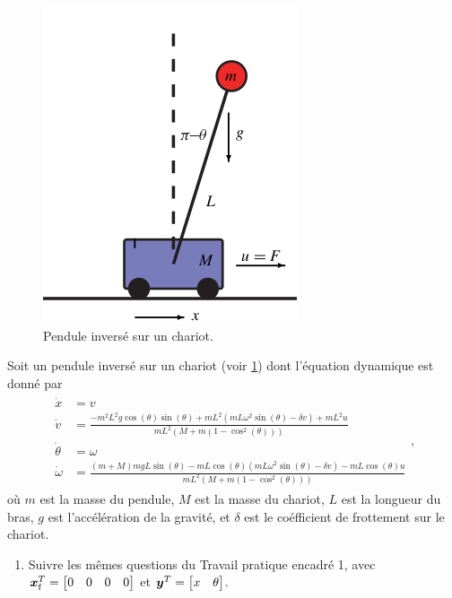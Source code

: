 \begin{tpe}
	\begin{figure}[h]
		\centering
		\includegraphics[width = 0.5\columnwidth]{cart-pole.png}
		\caption{Pendule inversé sur un chariot.}
		\label{fig:cart-pole}
	\end{figure}
	Soit un pendule inversé sur un chariot (voir \cref{fig:cart-pole}) dont l'équation dynamique est donné par 
	\begin{align}
		\begin{split}
			\dot{x}&=v\\
			\dot{v}&=\frac{-m^2L^2g\cos(\theta)\sin(\theta)+mL^2(mL\omega^2\sin(\theta)-\delta v)+mL^2u}{mL^2\left(M+m(1-\cos^2(\theta))\right)}\\
			\dot{\theta} &= \omega\\
			\dot{\omega} &= \frac{(m+M)mgL\sin(\theta)-mL\cos(\theta)(mL\omega^2\sin(\theta)-\delta v)-mL\cos(\theta)u}{mL^2\left(M+m(1-\cos^2(\theta))\right)}
		\end{split},
	\end{align}
	où $m$ est la masse du pendule, $M$ est la masse du chariot, $L$ est la longueur du bras, $g$ est l'accélération de la gravité,  et $\delta$ est le coéfficient de frottement sur le chariot.
	\begin{enumerate}
		\item Suivre les mêmes questions du Travail pratique encadré 1, avec $\bm{x}_{\rm f}^T = \begin{bmatrix}
			0 & 0 & 0 & 0
		\end{bmatrix}$ et $\bm{y}^T = \begin{bmatrix}
		x & \theta
		\end{bmatrix}$.
	\end{enumerate}
\end{tpe}